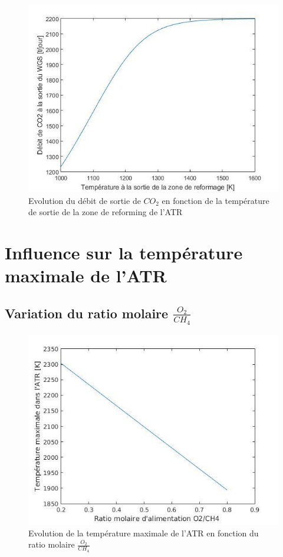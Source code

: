 \documentclass[12pt]{report}
\begin{document}
\begin{figure}[H]
\begin{center}
\includegraphics[scale=0.6]{debit_CO2_Temperature}
\caption{Evolution du débit de sortie de $CO_2$ en fonction de la température de sortie de la zone de reforming de l'ATR}
\end{center}
\end{figure}


\section{Influence sur la température maximale de l'ATR}

\subsection{Variation du ratio molaire $\frac{O_2}{CH_4}$}



\begin{figure}[H]
\begin{center}
\includegraphics[scale=0.6]{Tmax_ratio_O2}
\caption{Evolution de la température maximale de l'ATR en fonction du ratio molaire $\frac{O_2}{CH_4}$}
\end{center}
\end{figure}
\end{document}
